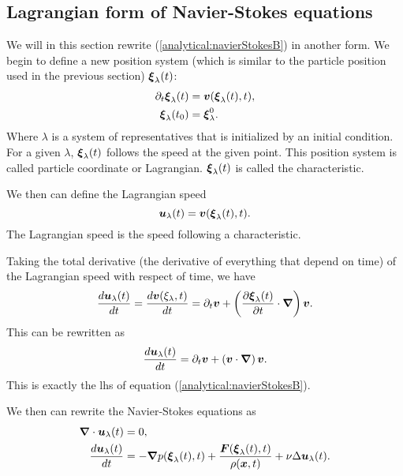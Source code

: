 \subsection{Lagrangian form of Navier-Stokes equations}
\label{analytical:convectif}
We will in this section rewrite (\ref{analytical:navierStokesB}) in another form.
We begin to define a new position system (which is similar to the particle position used in the previous section) ${\boldsymbol {\xi}}_{\lambda}(t)$:
\begin{subequations}
\begin{align}
 \partial_t {\boldsymbol {\xi}}_{\lambda}(t)&={\boldsymbol {v}}({\boldsymbol {\xi}}_{\lambda}(t),t),\\
 {\boldsymbol {\xi}}_{\lambda}(t_0)&={\boldsymbol {\xi}}^{0}_{\lambda}.
\end{align}
\end{subequations}
Where $\lambda$ is a system of representatives that is initialized by an initial condition.
For a given $\lambda$, ${\boldsymbol {\xi}}_{\lambda}(t)$ follows the speed at the given point.
This position system is called particle coordinate or Lagrangian.
${\boldsymbol {\xi}}_\lambda(t)$ is called the characteristic.

We then can define the Lagrangian speed
\begin{equation}
 {\boldsymbol {u}}_{\lambda}(t)={\boldsymbol {v}}({\boldsymbol {\xi}}_{\lambda}(t),t).
\end{equation}
The Lagrangian speed is the speed following a characteristic.

Taking the total derivative (the derivative of everything that depend on time) of the Lagrangian speed with respect of time, we have
\begin{equation}
\frac{d {\boldsymbol {u}}_{\lambda}(t)}{d t}=\frac{d {\boldsymbol {v}}(\xi_{\lambda},t)}{d t}=\partial_t {\boldsymbol {v}}+\left(\frac{\partial {\boldsymbol {\xi}}_{\lambda}(t)}{\partial t}\cdot{\boldsymbol {\nabla}}\right){\boldsymbol {v}}.
\end{equation}
This can be rewritten as
\begin{equation}
\frac{d {\boldsymbol {u}}_{\lambda}(t)}{d t}=\partial_t {\boldsymbol {v}}+\left({\boldsymbol {v}} \cdot{\boldsymbol {\nabla}}\right){\boldsymbol {v}}.
\end{equation}
This is exactly the lhs of equation (\ref{analytical:navierStokesB}).

We then can rewrite the Navier-Stokes equations as
\begin{subequations}
\begin{align}
\label{analytical:navierStokesLagA}
{\boldsymbol {\nabla}} \cdot {\boldsymbol {u}}_{\lambda}(t)&=0,\\
\label{analytical:navierStokesLagB}
\frac{d {\boldsymbol {u}}_{\lambda}(t)}{d t}&=-{\boldsymbol {\nabla}} p({\boldsymbol {\xi}}_{\lambda}(t),t)+\frac{{\boldsymbol {F}}({\boldsymbol {\xi}}_{\lambda}(t),t)}{\rho({\boldsymbol {x}},t)}+\nu \Delta {\boldsymbol {u}}_{\lambda}(t).
\end{align}
\end{subequations}

